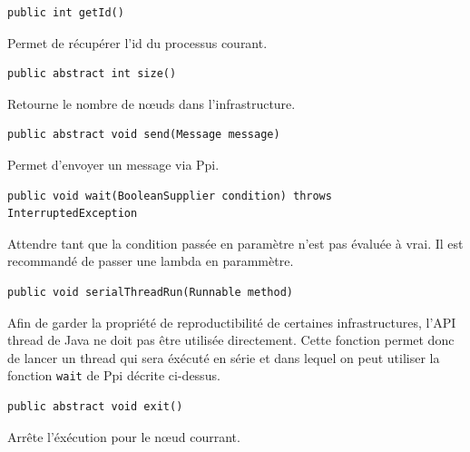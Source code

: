 \documentclass{article}
\begin{document}
					\noindent\begin{minipage}{\linewidth}
					\begin{lstlisting}
public int getId()
					\end{lstlisting}
					Permet de récupérer l'id du processus courant.
					\bigskip
					\end{minipage}

					\noindent\begin{minipage}{\linewidth}
					\begin{lstlisting}
public abstract int size()
					\end{lstlisting}
					Retourne le nombre de n\oe uds dans l'infrastructure.
					\bigskip
					\end{minipage}

					\noindent\begin{minipage}{\linewidth}
					\begin{lstlisting}
public abstract void send(Message message)
					\end{lstlisting}
					Permet d'envoyer un message via Ppi.
					\bigskip
					\end{minipage}

					\noindent\begin{minipage}{\linewidth}
					\begin{lstlisting}
public void wait(BooleanSupplier condition) throws InterruptedException
					\end{lstlisting}
					Attendre tant que la condition passée en paramètre n'est pas évaluée à vrai. Il est recommandé de
					passer une lambda en parammètre.
					\bigskip
					\end{minipage}

					\noindent\begin{minipage}{\linewidth}
					\begin{lstlisting}
public void serialThreadRun(Runnable method)
					\end{lstlisting}
					Afin de garder la propriété de reproductibilité de certaines infrastructures, l'API thread de Java
					ne doit pas être utilisée directement. Cette fonction permet donc de lancer un thread qui sera
					éxécuté en série et dans lequel on peut utiliser la fonction \lstinline{wait} de Ppi décrite ci-dessus.
					\bigskip
					\end{minipage}

					\noindent\begin{minipage}{\linewidth}
					\begin{lstlisting}
public abstract void exit()
					\end{lstlisting}
					Arrête l'éxécution pour le n\oe ud courrant.
					\bigskip
					\end{minipage}
\end{document}
